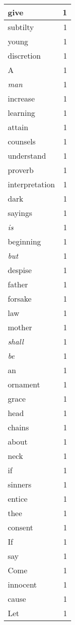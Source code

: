 \begin{center}
\begin{longtable}{l|r}
give & 1\\ \hline 
subtilty & 1\\ \hline 
young & 1\\ \hline 
discretion & 1\\ \hline 
A & 1\\ \hline 
\emph{man} & 1\\ \hline 
increase & 1\\ \hline 
learning & 1\\ \hline 
attain & 1\\ \hline 
counsels & 1\\ \hline 
understand & 1\\ \hline 
proverb & 1\\ \hline 
interpretation & 1\\ \hline 
dark & 1\\ \hline 
sayings & 1\\ \hline 
\emph{is} & 1\\ \hline 
beginning & 1\\ \hline 
\emph{but} & 1\\ \hline 
despise & 1\\ \hline 
father & 1\\ \hline 
forsake & 1\\ \hline 
law & 1\\ \hline 
mother & 1\\ \hline 
\emph{shall} & 1\\ \hline 
\emph{be} & 1\\ \hline 
an & 1\\ \hline 
ornament & 1\\ \hline 
grace & 1\\ \hline 
head & 1\\ \hline 
chains & 1\\ \hline 
about & 1\\ \hline 
neck & 1\\ \hline 
if & 1\\ \hline 
sinners & 1\\ \hline 
entice & 1\\ \hline 
thee & 1\\ \hline 
consent & 1\\ \hline 
If & 1\\ \hline 
say & 1\\ \hline 
Come & 1\\ \hline 
innocent & 1\\ \hline 
cause & 1\\ \hline 
Let & 1\\ \hline 

\end{longtable}
\end{center}
